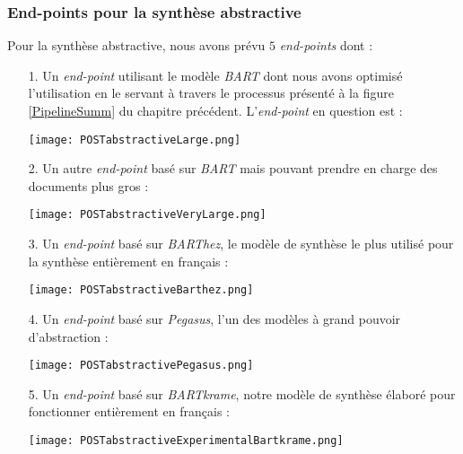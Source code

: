 \subsubsection{End-points pour la synthèse abstractive}
Pour la synthèse abstractive, nous avons prévu $ 5 $ \textit{end-points} dont :
\begin{itemize}
\item[1.] Un \textit{end-point} utilisant le modèle \textit{BART} dont nous avons optimisé l'utilisation en le servant à travers le processus présenté à la figure \ref{PipelineSumm} du chapitre précédent. L'\textit{end-point} en question est :
\begin{center}
\texttt{[image: POSTabstractiveLarge.png]}
\end{center}
\item[2.] Un autre \textit{end-point} basé sur \textit{BART} mais pouvant prendre en charge des documents plus gros :
\begin{center}
\texttt{[image: POSTabstractiveVeryLarge.png]}
\end{center}
\item[3.] Un \textit{end-point} basé sur \textit{BARThez}, le modèle de synthèse le plus utilisé pour la synthèse entièrement en français :
\begin{center}
\texttt{[image: POSTabstractiveBarthez.png]}
\end{center}
\item[4.] Un \textit{end-point} basé sur \textit{Pegasus}, l'un des modèles à grand pouvoir d'abstraction :
\begin{center}
\texttt{[image: POSTabstractivePegasus.png]}
\end{center}
\item[5.] Un \textit{end-point} basé sur \textit{BARTkrame}, notre modèle de synthèse élaboré pour fonctionner entièrement en français :
\begin{center}
\texttt{[image: POSTabstractiveExperimentalBartkrame.png]}
\end{center}
\end{itemize}
